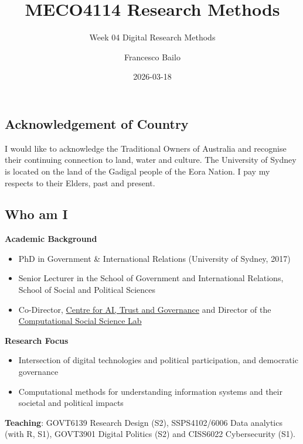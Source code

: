 \documentclass[
  letterpaper,
  DIV=11,
  numbers=noendperiod]{scrartcl}
\title{MECO4114 Research Methods}
\subtitle{Week 04 Digital Research Methods}
\author{Francesco Bailo}
\date{2026-03-18}
\providecommand{\tightlist}{%
  \setlength{\itemsep}{0pt}\setlength{\parskip}{0pt}}
\begin{document}
\maketitle


\subsection{Acknowledgement of
Country}\label{acknowledgement-of-country}

I would like to acknowledge the Traditional Owners of Australia and
recognise their continuing connection to land, water and culture. The
University of Sydney is located on the land of the Gadigal people of the
Eora Nation. I pay my respects to their Elders, past and present.

\subsection{Who am I}\label{who-am-i}

\textbf{Academic Background}

\begin{itemize}
\tightlist
\item
  PhD in Government \& International Relations (University of Sydney,
  2017)
\item
  Senior Lecturer in the School of Government and International
  Relations, School of Social and Political Sciences
\item
  Co-Director,
  \href{https://www.sydney.edu.au/arts/our-research/centres-institutes-and-groups/centre-for-ai-trust-and-governance.html}{Centre
  for AI, Trust and Governance} and Director of the
  \href{https://canvas.sydney.edu.au/courses/65547}{Computational Social
  Science Lab}
\end{itemize}

\textbf{Research Focus}

\begin{itemize}
\tightlist
\item
  Intersection of digital technologies and political participation, and
  democratic governance
\item
  Computational methods for understanding information systems and their
  societal and political impacts
\end{itemize}

\textbf{Teaching}: GOVT6139 Research Design (S2), SSPS4102/6006 Data
analytics (with R, S1), GOVT3901 Digital Politics (S2) and CISS6022
Cybersecurity (S1).
\end{document}
